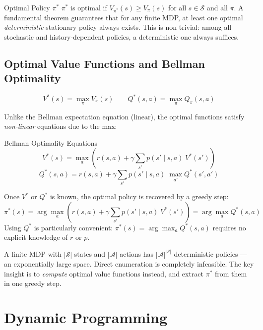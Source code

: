 \documentclass[11pt,a4paper]{article}
\begin{document}
\begin{defbox}{Optimal Policy $\pi^*$}
$\pi^*$ is optimal if $V_{\pi^*}(s) \geq V_\pi(s)$ for all $s \in \mathcal{S}$ and all $\pi$. A fundamental theorem guarantees that for any finite MDP, at least one optimal \emph{deterministic} stationary policy always exists. This is non-trivial: among all stochastic and history-dependent policies, a deterministic one always suffices.
\end{defbox}

\subsection{Optimal Value Functions and Bellman Optimality}

\[
V^*(s) = \max_\pi V_\pi(s) \qquad Q^*(s,a) = \max_\pi Q_\pi(s,a)
\]

Unlike the Bellman expectation equation (linear), the optimal functions satisfy \emph{non-linear} equations due to the max:

\begin{thmbox}{Bellman Optimality Equations}
\[
V^*(s) = \max_{a}\!\left( r(s,a) + \gamma \sum_{s'} p(s'\mid s,a)\; V^*(s') \right)
\]
\[
Q^*(s,a) = r(s,a) + \gamma \sum_{s'} p(s'\mid s,a)\; \max_{a'} Q^*(s',a')
\]
\end{thmbox}

Once $V^*$ or $Q^*$ is known, the optimal policy is recovered by a greedy step:
\[
\pi^*(s) = \arg\max_a \!\left( r(s,a) + \gamma \sum_{s'} p(s'\mid s,a)\; V^*(s') \right) = \arg\max_a Q^*(s,a)
\]
Using $Q^*$ is particularly convenient: $\pi^*(s) = \arg\max_a Q^*(s,a)$ requires no explicit knowledge of $r$ or $p$.

\begin{tcolorbox}[colback=LightBlue,colframe=AccentBlue,boxrule=0.8pt,arc=3pt]
A finite MDP with $|\mathcal{S}|$ states and $|\mathcal{A}|$ actions has $|\mathcal{A}|^{|\mathcal{S}|}$ deterministic policies --- an exponentially large space. Direct enumeration is completely infeasible. The key insight is to \emph{compute} optimal value functions instead, and extract $\pi^*$ from them in one greedy step.
\end{tcolorbox}

\section{Dynamic Programming}
\end{document}
